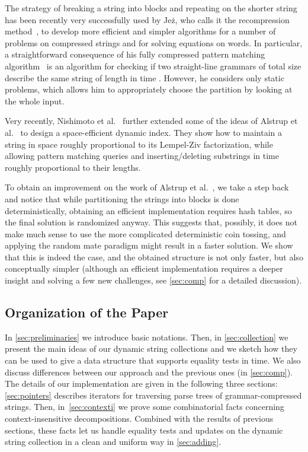 \documentclass[a4paper]{article}
\theoremstyle{remark}
\begin{document}
The strategy of breaking a string into blocks and repeating on the shorter string has been
recently very successfully used by Jeż, who calls it the recompression method~\cite{JezRecompression},
to develop more efficient and simpler algorithms for a number of problems on compressed strings and for solving
equations on words. In particular, a straightforward consequence of his fully compressed pattern
matching algorithm~\cite{JezFully} is an algorithm for checking if two straight-line grammars
of total size  describe the same string of length  in time .
However, he considers only static problems, which allows him to appropriately choose the partition 
by looking at the whole input.

Very recently, Nishimoto et al.~\cite{DBLP:journals/corr/NishimotoIIBT15} further extended
some of the ideas of Alstrup et al.~\cite{Alstrup} to design a space-efficient dynamic index.
They show how to maintain a string in space roughly proportional to its Lempel-Ziv factorization,
while allowing pattern matching queries and inserting/deleting substrings in time roughly proportional
to their lengths.

To obtain an improvement on the
work of Alstrup et al.~\cite{Alstrup}, we take a step back and notice that while partitioning
the strings into blocks is done deterministically, obtaining an efficient implementation
requires hash tables, so the final solution is randomized anyway. This suggests that, possibly, it does
not make much sense to use the more complicated deterministic coin tossing, and applying
the random mate paradigm might result in a faster solution. We show
that this is indeed the case, and the obtained structure is not only faster, but also conceptually
simpler (although an efficient implementation requires a deeper insight and solving a few new
challenges, see \cref{sec:comp} for a detailed discussion).

\subsection{Organization of the Paper}
In \cref{sec:preliminaries} we introduce basic notations.
Then, in \cref{sec:collection} we present the main ideas of our dynamic string collections
and we sketch how they can be used to give a data structure that supports equality tests in  time.
We also discuss differences between our approach and the previous ones (in \cref{sec:comp}).
The details of our implementation are given in the following three sections:
\cref{sec:pointers} describes iterators for traversing parse trees of grammar-compressed strings.
Then, in~\cref{sec:contexti} we prove some combinatorial facts concerning context-insensitive decompositions.
Combined with the results of previous sections, these facts let us handle equality tests and updates on the dynamic string collection in a clean and uniform way
in \cref{sec:adding}.
\end{document}
